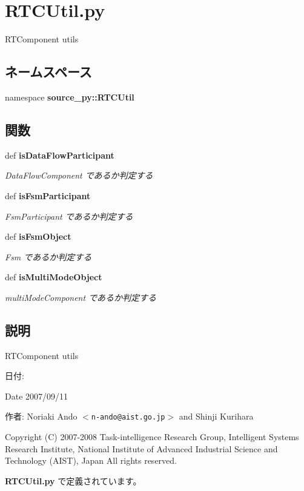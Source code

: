 \section{RTCUtil.py}
\label{_r_t_c_util_8py}
RTComponent utils 

\subsection*{ネームスペース}
\begin{CompactItemize}
\item 
namespace \textbf{source\_\-py::RTCUtil}
\end{CompactItemize}
\subsection*{関数}
\begin{CompactItemize}
\item 
def {\bf isDataFlowParticipant}
\begin{CompactList}\small\item\em DataFlowComponent であるか判定する \item\end{CompactList}\item 
def {\bf isFsmParticipant}
\begin{CompactList}\small\item\em FsmParticipant であるか判定する \item\end{CompactList}\item 
def {\bf isFsmObject}
\begin{CompactList}\small\item\em Fsm であるか判定する \item\end{CompactList}\item 
def {\bf isMultiModeObject}
\begin{CompactList}\small\item\em multiModeComponent であるか判定する \item\end{CompactList}\end{CompactItemize}


\subsection{説明}
RTComponent utils 

\begin{Desc}
\item[日付:]\end{Desc}
\begin{Desc}
\item[Date]2007/09/11 \end{Desc}
\begin{Desc}
\item[作者:]Noriaki Ando $<${\tt n-ando@aist.go.jp}$>$ and Shinji Kurihara\end{Desc}
Copyright (C) 2007-2008 Task-intelligence Research Group, Intelligent Systems Research Institute, National Institute of Advanced Industrial Science and Technology (AIST), Japan All rights reserved. 

 {\bf RTCUtil.py} で定義されています。